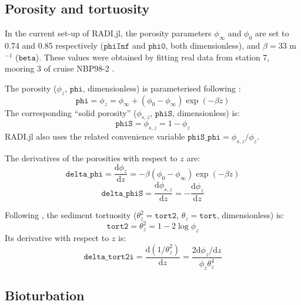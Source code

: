 \documentclass[a4paper]{article}
\newcommand{\D}[1]{\mathrm{d}#1}
\newcommand{\code}[1]{\texttt{#1}}
\begin{document}
\subsection{Porosity and tortuosity}

In the current set-up of RADI.jl, the porosity parameters $\phi_\infty$ and $\phi_0$ are set to 0.74 and 0.85 respectively ($\code{phiInf}$ and $\code{phi0}$, both dimensionless), and $\beta = 33$ m$^{-1}$ ($\code{beta}$).  These values were obtained by fitting real data from station 7, mooring 3 of cruise NBP98-2 \citep{sayles_benthic_2001}.

The porosity ($\phi_z$, $\code{phi}$, dimensionless) is parameterised following \citet{boudreau_method_1996}:
\begin{equation}\label{phi}
\code{phi} = \phi_z = \phi_\infty + (\phi_0 - \phi_\infty) \exp(-\beta z)
\end{equation}
The corresponding ``solid porosity'' ($\phi_{s,z}$, $\code{phiS}$, dimensionless) is:
\begin{equation}\label{phiS}
\code{phiS} = \phi_{s,z} = 1 - \phi_z
\end{equation}
RADI.jl also uses the related convenience variable $\code{phiS\_phi} = \phi_{s,z}/\phi_z$.

The derivatives of the porosities with respect to $z$ are:
\begin{equation}
\code{delta\_phi} = \frac{\D{\phi_z}}{\D{z}} = -\beta (\phi_0 - \phi_\infty) \exp (-\beta z)
\end{equation}
\begin{equation}
\code{delta\_phiS} = \frac{\D{\phi_{s,z}}}{\D{z}} = -\frac{\D{\phi_z}}{\D{z}}
\end{equation}

Following \citet{boudreau_diffusive_1996}, the sediment tortuosity ($\theta_z^2 = \code{tort2}$, $\theta_z = \code{tort}$, dimensionless) is:
\begin{equation}\label{tort}
\code{tort2} = \theta_z^2 = 1 - 2 \log \phi_z
\end{equation}
Its derivative with respect to $z$ is:
\begin{equation}
\code{delta\_tort2i} = \frac{\D{(1 / \theta_z^2)}}{\D{z}} = \frac{2 \D{\phi_z}/\D{z}}{\phi_z \theta_z^4}
\end{equation}


\subsection{Bioturbation}
\end{document}
